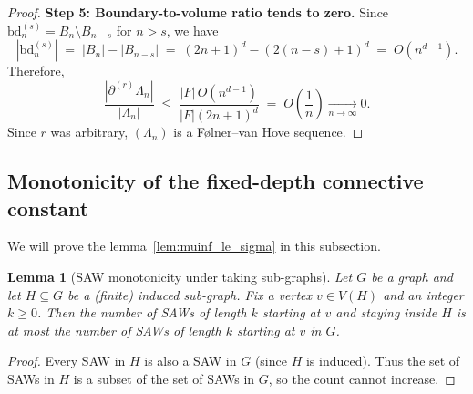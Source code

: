 \documentclass[a4paper,11pt]{article}
\theoremstyle{plain}
\newtheorem{lemma}[theorem]{Lemma}
\theoremstyle{definition}
\theoremstyle{remark}
\newcommand{\1}{\mathbf{1}}
\begin{document}
\begin{proof}
\smallskip
\textbf{Step 5: Boundary-to-volume ratio tends to zero.}
Since $\mathrm{bd}_n^{(s)} = B_n\setminus B_{n-s}$ for $n>s$, we have
\[
|\mathrm{bd}_n^{(s)}|
\;=\;
|B_n|-|B_{n-s}|
\;=\;
(2n+1)^d - (2(n-s)+1)^d
\;=\; O(n^{d-1}).
\]
Therefore,
\[
\frac{|\partial^{(r)}\Lambda_n|}{|\Lambda_n|}
\;\le\;
\frac{|F|\,O(n^{d-1})}{|F|(2n+1)^d}
\;=\; O\!\left(\frac{1}{n}\right)\xrightarrow[n\to\infty]{}0.
\]
Since $r$ was arbitrary, $(\Lambda_n)$ is a Følner--van Hove sequence.
\end{proof}

\subsection{Monotonicity of the fixed-depth connective constant}
\label{subsec:monotonicity_cc}

We will prove the lemma~\ref{lem:muinf_le_sigma} in this subsection.

\begin{lemma}[SAW monotonicity under taking sub-graphs]
\label{lem:saw_monotonicity}
Let $G$ be a graph and let $H\subseteq G$ be a (finite) induced sub-graph. Fix a vertex $v\in V(H)$ and an integer
$k\ge 0$. Then the number of SAWs of length $k$ starting at $v$ and staying inside $H$ is at most the number
of SAWs of length $k$ starting at $v$ in $G$.
\end{lemma}

\begin{proof}
Every SAW in $H$ is also a SAW in $G$ (since $H$ is induced). Thus the set of SAWs in $H$ is a subset of the set
of SAWs in $G$, so the count cannot increase.
\end{proof}

\end{document}
